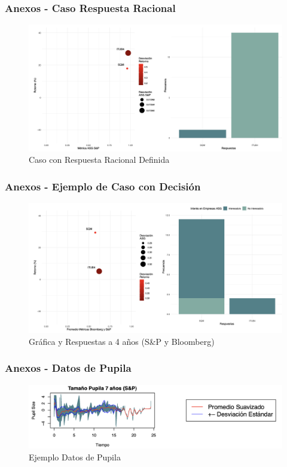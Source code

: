 \documentclass{beamer}
\begin{document}
\begin{frame}
    \frametitle{Anexos - Caso Respuesta Racional}
    \begin{figure}
        \includegraphics[width=1\textwidth]{CasoRespuestaRacional.png}
        \caption{Caso con Respuesta Racional Definida}
    \end{figure}
\end{frame}

\begin{frame}
    \frametitle{Anexos - Ejemplo de Caso con Decisión}
    \begin{figure}
        \includegraphics[width=1\textwidth]{Decision.png}
        \caption{Gráfica y Respuestas a 4 años (S\&P y Bloomberg)}
    \end{figure}
\end{frame}

\begin{frame}
    \frametitle{Anexos - Datos de Pupila}
    \begin{figure}
        \includegraphics[width=1\textwidth]{DatosPupilares.png}
        \caption{Ejemplo Datos de Pupila}
    \end{figure}
\end{frame}
\end{document}
